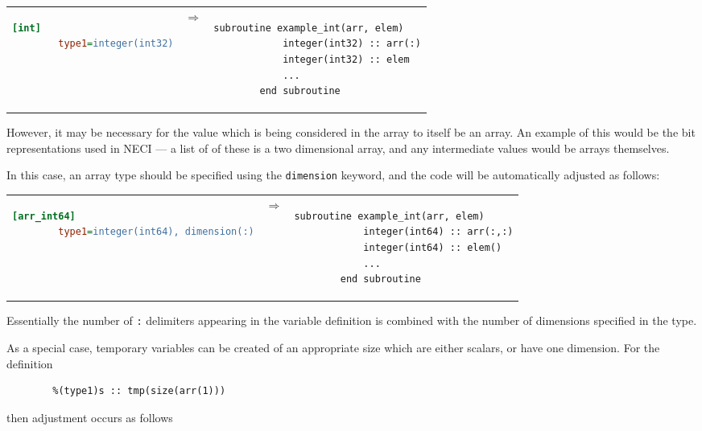 \documentclass[a4paper,notitlepage]{scrreprt}
\let\code\lstinline
\begin{document}
{{	\begin{center}
	\begin{tabular}{lcl}
	\begin{lstlisting}[language=ini,gobble=8]
		[int]
		type1=integer(int32)
	\end{lstlisting}
	
	& $\Longrightarrow$ &	
	
	\begin{lstlisting}[gobble=8]
		subroutine example_int(arr, elem)
			integer(int32) :: arr(:)
			integer(int32) :: elem
			...
		end subroutine
	\end{lstlisting}
	\end{tabular}
	\end{center}
	
	However, it may be necessary for the value which is being considered in
	the array to itself be an array. An example of this would be the bit
	representations used in NECI --- a list of of these is a two dimensional
	array, and any intermediate values would be arrays themselves.
	
	In this case, an array type should be specified using the \code{dimension}
	keyword, and the code will be automatically adjusted as follows:
	
	\begin{tabular}{lcl}
	\begin{lstlisting}[language=ini,gobble=8]
		[arr_int64]
		type1=integer(int64), dimension(:)
	\end{lstlisting}
	
	& $\Longrightarrow$ &	
	
	\begin{lstlisting}[gobble=8]
		subroutine example_int(arr, elem)
			integer(int64) :: arr(:,:)
			integer(int64) :: elem()
			...
		end subroutine
	\end{lstlisting}
	\end{tabular}
	
	Essentially the number of \code{:} delimiters appearing in the variable
	definition is combined with the number of dimensions specified in the type.
	
	As a special case, temporary variables can be created of an appropriate
	size which are either scalars, or have one dimension. For the definition
	\begin{lstlisting}[gobble=4]
		%(type1)s :: arr(:)
		%(type1)s :: tmp(size(arr(1)))
	\end{lstlisting}
	then adjustment occurs as follows
			
}}
\end{document}
